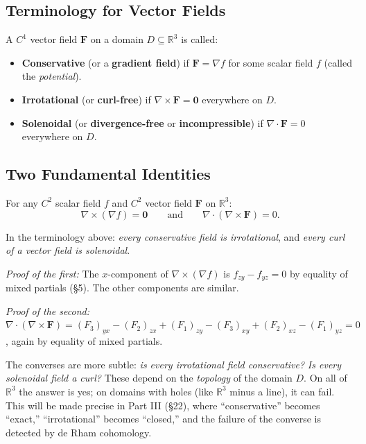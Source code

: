 \documentclass[11pt]{report}
\newcommand{\R}{\mathbb{R}}
\begin{document}
\subsection*{Terminology for Vector Fields}

\begin{definition}
A $C^1$ vector field $\mathbf{F}$ on a domain $D \subseteq \R^3$ is called:
\begin{itemize}
    \item \textbf{Conservative} (or a \textbf{gradient field}) if $\mathbf{F} = \nabla f$ for some scalar field $f$ (called the \textit{potential}).
    \item \textbf{Irrotational} (or \textbf{curl-free}) if $\nabla \times \mathbf{F} = \mathbf{0}$ everywhere on $D$.
    \item \textbf{Solenoidal} (or \textbf{divergence-free} or \textbf{incompressible}) if $\nabla \cdot \mathbf{F} = 0$ everywhere on $D$.
\end{itemize}
\end{definition}

\subsection*{Two Fundamental Identities}

For any $C^2$ scalar field $f$ and $C^2$ vector field $\mathbf{F}$ on $\R^3$:
\[
\nabla \times (\nabla f) = \mathbf{0} \qquad \text{and} \qquad \nabla \cdot (\nabla \times \mathbf{F}) = 0.
\]

In the terminology above: \textit{every conservative field is irrotational}, and \textit{every curl of a vector field is solenoidal}.

\textit{Proof of the first:} The $x$-component of $\nabla \times (\nabla f)$ is $f_{zy} - f_{yz} = 0$ by equality of mixed partials (\S5). The other components are similar.

\textit{Proof of the second:} $\nabla \cdot (\nabla \times \mathbf{F}) = (F_3)_{yx} - (F_2)_{zx} + (F_1)_{zy} - (F_3)_{xy} + (F_2)_{xz} - (F_1)_{yz} = 0$, again by equality of mixed partials.

The converses are more subtle: \textit{is every irrotational field conservative?} \textit{Is every solenoidal field a curl?} These depend on the \textit{topology} of the domain $D$. On all of $\R^3$ the answer is yes; on domains with holes (like $\R^3$ minus a line), it can fail. This will be made precise in Part III (\S22), where ``conservative'' becomes ``exact,'' ``irrotational'' becomes ``closed,'' and the failure of the converse is detected by de Rham cohomology.
\end{document}
